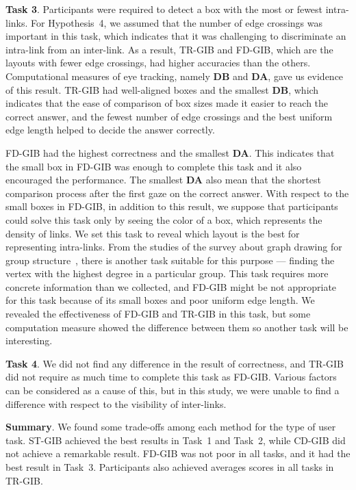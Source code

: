 \documentclass[review]{vgtc}                 %
\begin{document}
{\bf Task 3}. Participants were required to detect a box with the most or fewest intra-links.
For Hypothesis~4, we assumed that the number of edge crossings was important in this task, which indicates that it was challenging to discriminate an intra-link from an inter-link.
As a result, TR-GIB and FD-GIB, which are the layouts with fewer edge crossings, had higher accuracies than the others.
Computational measures of eye tracking, namely {\bf DB} and {\bf DA}, gave us evidence of this result.
TR-GIB had well-aligned boxes and the smallest {\bf DB}, which indicates that the ease of comparison of box sizes made it easier to reach the correct answer, and the fewest number of edge crossings and the best uniform edge length helped to decide the answer correctly.

FD-GIB had the highest correctness and the smallest {\bf DA}.
This indicates that the small box in FD-GIB was enough to complete this task and it also encouraged the performance.
The smallest {\bf DA} also mean that the shortest comparison process after the first gaze on the correct answer.
With respect to the small boxes in FD-GIB, in addition to this result, we suppose that participants could solve this task only by seeing the color of a box, which represents the density of links.
We set this task to reveal which layout is the best for representing intra-links.
From the studies of the survey about graph drawing for group structure~\cite{Vehlow2017VisualizingGS,saket2014group}, there is another task suitable for this purpose --- finding the vertex with the highest degree in a particular group.
This task requires more concrete information than we collected, and FD-GIB might be not appropriate for this task because of its small boxes and poor uniform edge length.
We revealed the effectiveness of FD-GIB and TR-GIB in this task, but some computation measure showed the difference between them so another task will be interesting.


{\bf Task 4}. We did not find any difference in the result of correctness, and TR-GIB did not require as much time to complete this task as FD-GIB.
Various factors can be considered as a cause of this, but in this study, we were unable to find a difference with respect to the visibility of inter-links.

{\bf Summary}. We found some trade-offs among each method for the type of user task.
ST-GIB achieved the best results in Task~1 and Task~2, while CD-GIB did not achieve a remarkable result.
FD-GIB was not poor in all tasks, and it had the best result in Task~3.
Participants also achieved averages scores in all tasks in TR-GIB.
\end{document}

